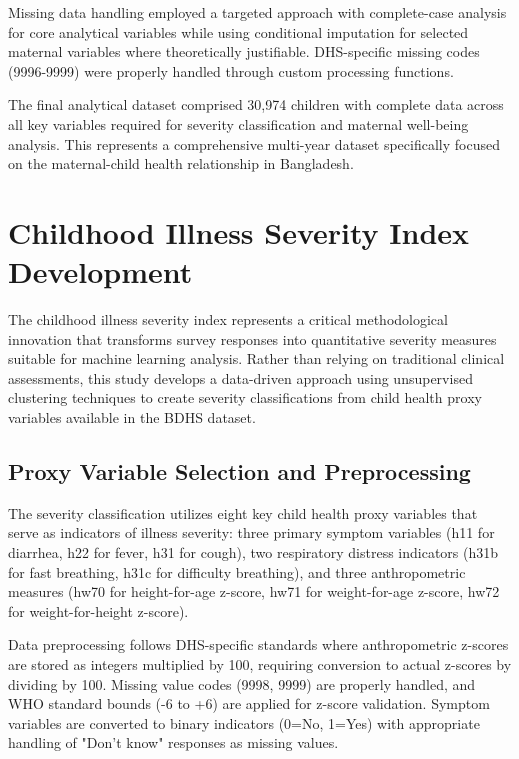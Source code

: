 \documentclass[12pt]{report}
\begin{document}
Missing data handling employed a targeted approach with complete-case analysis for core analytical variables while using conditional imputation for selected maternal variables where theoretically justifiable. DHS-specific missing codes (9996-9999) were properly handled through custom processing functions.

The final analytical dataset comprised 30,974 children with complete data across all key variables required for severity classification and maternal well-being analysis. This represents a comprehensive multi-year dataset specifically focused on the maternal-child health relationship in Bangladesh.

\section{Childhood Illness Severity Index Development}

The childhood illness severity index represents a critical methodological innovation that transforms survey responses into quantitative severity measures suitable for machine learning analysis. Rather than relying on traditional clinical assessments, this study develops a data-driven approach using unsupervised clustering techniques to create severity classifications from child health proxy variables available in the BDHS dataset.

\subsection{Proxy Variable Selection and Preprocessing}

The severity classification utilizes eight key child health proxy variables that serve as indicators of illness severity: three primary symptom variables (h11 for diarrhea, h22 for fever, h31 for cough), two respiratory distress indicators (h31b for fast breathing, h31c for difficulty breathing), and three anthropometric measures (hw70 for height-for-age z-score, hw71 for weight-for-age z-score, hw72 for weight-for-height z-score).

Data preprocessing follows DHS-specific standards where anthropometric z-scores are stored as integers multiplied by 100, requiring conversion to actual z-scores by dividing by 100. Missing value codes (9998, 9999) are properly handled, and WHO standard bounds (-6 to +6) are applied for z-score validation. Symptom variables are converted to binary indicators (0=No, 1=Yes) with appropriate handling of "Don't know" responses as missing values.
\end{document}
